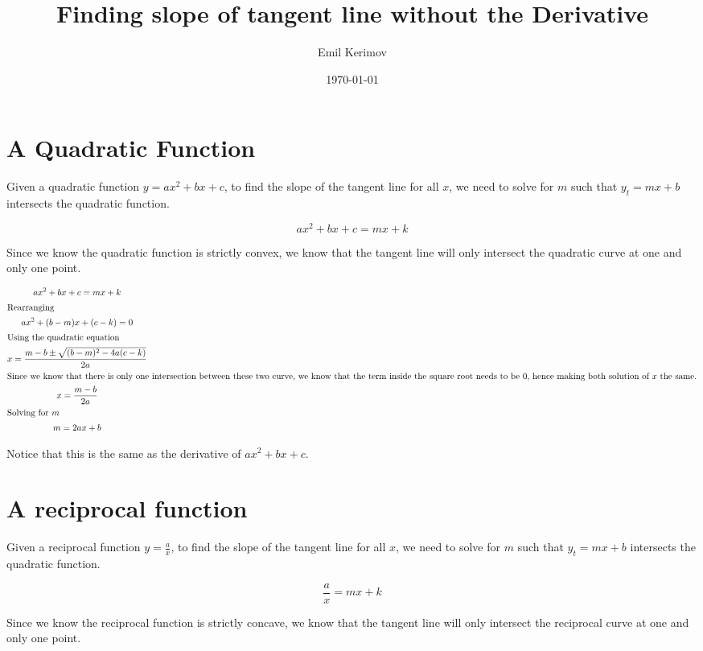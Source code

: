 \documentclass[a4paper]{article}
\title{Finding slope of tangent line without the Derivative}
\author{Emil Kerimov}
\date{\today}
\begin{document}
\maketitle

\section{A Quadratic Function}

Given a quadratic function $ y = ax^2 + bx + c$, to find the slope of the tangent line for all $x$, we need to solve for $m$ such that $y_t = mx+b$ intersects the quadratic function.

\begin{equation}
ax^2 + bx + c = mx+k
\end{equation}

Since we know the quadratic function is strictly convex, we know that the tangent line will only intersect the quadratic curve at one and only one point.

\begin{gather*}
ax^2 + bx + c = mx+k\\
\shortintertext{Rearranging}
ax^2 + (b-m)x + (c-k) = 0\\
\shortintertext{Using the quadratic equation}
x = \frac{m-b \pm \sqrt{(b-m)^2 - 4a(c-k)}}{2a}\\
\shortintertext{Since we know that there is only one intersection between these two curve, we know that the term inside the square root needs to be $0$, hence making both solution of $x$ the same.}
x = \frac{m-b}{2a}\\
\shortintertext{Solving for $m$}
 m = 2ax +b \\
\end{gather*}

Notice that this is the same as the derivative of $ax^2 + bx +c$.

\section{A reciprocal function}
Given a reciprocal function $ y = \frac{a}{x}$, to find the slope of the tangent line for all $x$, we need to solve for $m$ such that $y_t = mx+b$ intersects the quadratic function.

\begin{equation}
\frac{a}{x} = mx+k
\end{equation}

Since we know the reciprocal function is strictly concave, we know that the tangent line will only intersect the reciprocal curve at one and only one point.
\end{document}
